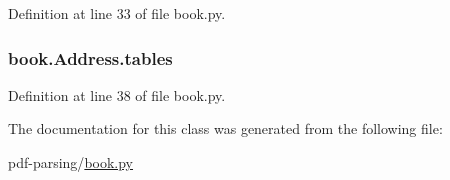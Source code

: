 Definition at line 33 of file book.\+py.

\subsubsection[{\texorpdfstring{tables}{tables}}]{\setlength{\rightskip}{0pt plus 5cm}book.\+Address.\+tables}\hypertarget{classbook_1_1_address_a1b85dcd18becccd98b66f132ce20009e}{}\label{classbook_1_1_address_a1b85dcd18becccd98b66f132ce20009e}


Definition at line 38 of file book.\+py.



The documentation for this class was generated from the following file\+:\begin{DoxyCompactItemize}
\item 
pdf-\/parsing/\hyperlink{book_8py}{book.\+py}\end{DoxyCompactItemize}

